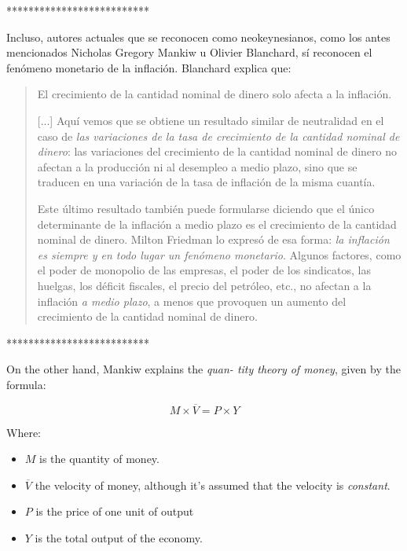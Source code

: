 \documentclass[12pt,a4paper,twoside]{book}
\begin{document}
\begin{itemize}
**************************

Incluso, autores actuales que se reconocen como neokeynesianos, como los antes mencionados Nicholas Gregory Mankiw u Olivier Blanchard, sí reconocen el fenómeno monetario de la inflación. Blanchard explica que:

\begin{quotation}
El crecimiento de la cantidad nominal de dinero solo afecta a la inflación.

[...] Aquí vemos que se obtiene un resultado similar de neutralidad en el caso de \textit{las variaciones de la tasa de crecimiento de la cantidad nominal de dinero}: las variaciones del crecimiento de la cantidad nominal de dinero no afectan a la producción ni al desempleo a medio plazo, sino que se traducen en una variación de la tasa de inflación de la misma cuantía.

Este último resultado también puede formularse diciendo que el único determinante de la inflación a medio plazo es el crecimiento de la cantidad nominal de dinero. Milton Friedman lo expresó de esa forma: \textit{la inflación es siempre y en todo lugar un fenómeno monetario}. Algunos factores, como el poder de monopolio de las empresas, el poder de los sindicatos, las huelgas, los déficit fiscales, el precio del petróleo, etc., no afectan a la inflación \textit{a medio plazo}, a menos que provoquen un aumento del crecimiento de la cantidad nominal de dinero. \cite[pág. 234]{blanchard}
\end{quotation}

**************************

On the other hand, Mankiw explains the \textit{quan-
tity theory of money}, given by the formula:

\begin{equation}\label{QTM}
M \times \overline{V} = P \times Y
\end{equation}

\begin{flushright}
\cite[p.~89]{mankiw:macroeconomics}
\end{flushright}

Where:

\begin{itemize}
\item $ M $ is the quantity of money.
\item $ \overline{V} $ the velocity of money, although it's assumed that the velocity is \textit{constant}.
\item $ P $ is the price of one unit of
output
\item $ Y $ is the total output of the economy.
\end{itemize}


\end{itemize}
\end{document}
